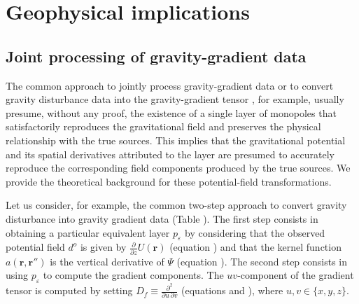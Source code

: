 \section{Geophysical implications}

\subsection{Joint processing of gravity-gradient data}

The common approach to jointly process gravity-gradient data 
\cite[e.g.,][]{boggs-dransfield2004,barnes_lumley2011, martinez_li_2016} or to convert gravity disturbance data into the 
gravity-gradient tensor \cite[e.g.,][]{piauilino_etal2019_seg, oliveirajr_etal2023}, for example, 
usually presume, without any proof, the existence of a single layer of 
monopoles that satisfactorily reproduces the gravitational field and
preserves the physical relationship with the true sources.
This implies that the gravitational potential and its spatial derivatives attributed to the layer are presumed to 
accurately reproduce the corresponding field components produced by the true sources.
We provide the theoretical background for these potential-field transformations.

Let us consider, for example, the common two-step approach to convert gravity disturbance into gravity
gradient data (Table ). The first step consists in obtaining a particular equivalent layer $p_{\varepsilon}$ 
by considering that the observed potential field $d^{o}$ is given by $\tfrac{\partial}{\partial z} U(\mathbf{r})$ 
(equation ) and that the kernel function 
$a(\mathbf{r}, \mathbf{r}'')$ is the vertical derivative of $\Psi$ (equation ).
The second step consists in using $p_{\varepsilon}$ to compute the gradient components.
The $uv$-component of the gradient tensor is computed by setting $D_{f} \equiv \tfrac{\partial^{2}}{\partial u \, \partial v}$
(equations  and ),
where $u, v \in \{ x, y, z \}$.

